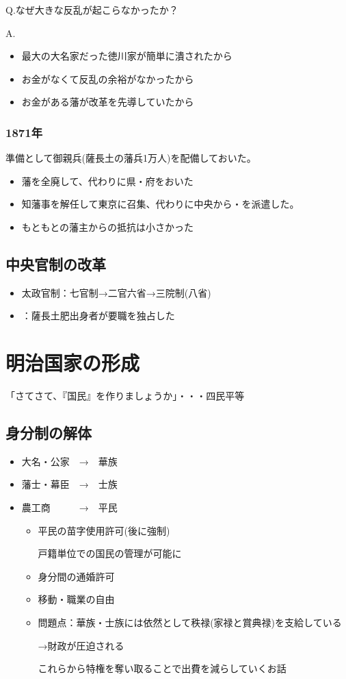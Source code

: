 \documentclass[12pt]{ltjsarticle}
\begin{document}
Q.なぜ大きな反乱が起こらなかったか？

A.
\begin{itemize}
\item 最大の大名家だった徳川家が簡単に潰されたから
\item お金がなくて反乱の余裕がなかったから
\item お金がある藩が改革を先導していたから
\end{itemize}

\subsubsection*{1871年 }
準備として御親兵(薩長土の藩兵1万人)を配備しておいた。
\begin{itemize}
\item 藩を全廃して、代わりに県・府をおいた
\item 知藩事を解任して東京に召集、代わりに中央から・を派遣した。
\item もともとの藩主からの抵抗は小さかった
\end{itemize}
\subsection{中央官制の改革}
\begin{itemize}
\item 太政官制：七官制→二官六省→三院制(八省)
\item {}：薩長土肥出身者が要職を独占した
\end{itemize}

\section{明治国家の形成}
「さてさて、『国民』を作りましょうか」・・・四民平等
\subsection{身分制の解体}
\begin{itemize}
\item 大名・公家　→　華族
\item 藩士・幕臣　→　士族
\item 農工商　　　→　平民

\begin{itemize}
\item 平民の苗字使用許可(後に強制)

戸籍単位での国民の管理が可能に
\item 身分間の通婚許可
\item 移動・職業の自由
\item 問題点：華族・士族には依然として秩禄(家禄と賞典禄)を支給している

→財政が圧迫される

これらから特権を奪い取ることで出費を減らしていくお話
\end{itemize}
\end{itemize}
\end{document}
